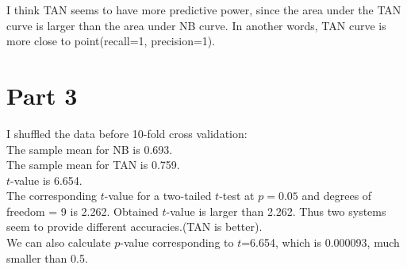 \documentclass{article}
\newenvironment{soln}{
	\leavevmode\color{red}\ignorespaces
}{}
\begin{document}
\begin{enumerate}
\begin{enumerate}
\begin{soln}
I think TAN seems to have more predictive power, since the area under the TAN curve is larger than the area under NB curve. In another words, TAN curve is more close to point(recall=1, precision=1).\\

\section*{Part 3}
I shuffled the data before 10-fold cross validation:\\
The sample mean for NB is 0.693.\\
The sample mean for TAN is 0.759.\\
$t$-value is 6.654.\\
The corresponding $t$-value for a two-tailed $t$-test at $p=0.05$ and degrees of freedom = 9 is  2.262. Obtained $t$-value is larger than 2.262. Thus two systems seem to provide different accuracies.(TAN is better). \\
We can also calculate $p$-value corresponding to $t$=6.654, which is 0.000093, much smaller than 0.5.
\end{soln}


\end{enumerate}
\end{enumerate}
\end{document}
